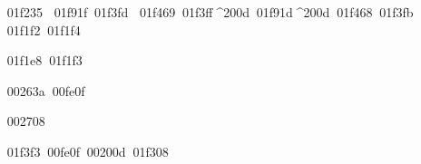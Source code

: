\documentclass{article}
\begin{document}
\EmojiFont
^^^^^^01f235
^^^^^^01f91f^^^^^^01f3fd
^^^^^^01f469^^^^^^01f3ff^^^^200d^^^^^^01f91d^^^^200d^^^^^^01f468^^^^^^01f3fb
^^^^^^01f1f2^^^^^^01f1f4

^^^^^^01f1e8^^^^^^01f1f3

^^^^^^00263a^^^^^^00fe0f

^^^^^^002708

^^^^^^01f3f3^^^^^^00fe0f^^^^^^00200d^^^^^^01f308 
\end{document}
